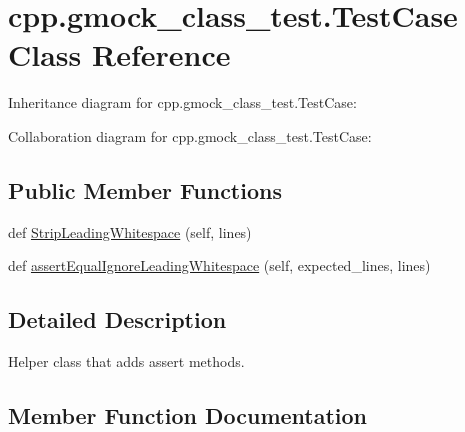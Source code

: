 \hypertarget{classcpp_1_1gmock__class__test_1_1TestCase}{}\section{cpp.\+gmock\+\_\+class\+\_\+test.\+Test\+Case Class Reference}
\label{classcpp_1_1gmock__class__test_1_1TestCase}


Inheritance diagram for cpp.\+gmock\+\_\+class\+\_\+test.\+Test\+Case\+:


Collaboration diagram for cpp.\+gmock\+\_\+class\+\_\+test.\+Test\+Case\+:
\subsection*{Public Member Functions}
\begin{DoxyCompactItemize}
\item 
def \hyperlink{classcpp_1_1gmock__class__test_1_1TestCase_a366b15717eebc41e397357868c5734c5}{Strip\+Leading\+Whitespace} (self, lines)
\item 
def \hyperlink{classcpp_1_1gmock__class__test_1_1TestCase_a68f88bba11511f8c582123d47bf80464}{assert\+Equal\+Ignore\+Leading\+Whitespace} (self, expected\+\_\+lines, lines)
\end{DoxyCompactItemize}


\subsection{Detailed Description}
\begin{DoxyVerb}Helper class that adds assert methods.\end{DoxyVerb}
 

\subsection{Member Function Documentation}
\mbox{\label{classcpp_1_1gmock__class__test_1_1TestCase_a68f88bba11511f8c582123d47bf80464}} 
